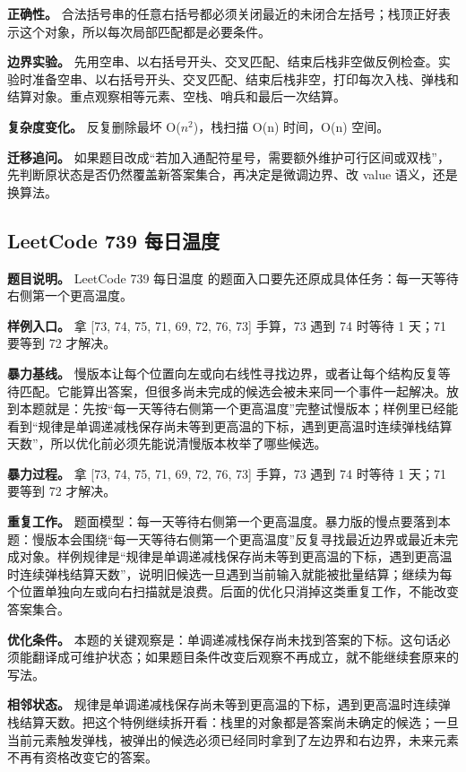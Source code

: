 \textbf{正确性。} 合法括号串的任意右括号都必须关闭最近的未闭合左括号；栈顶正好表示这个对象，所以每次局部匹配都是必要条件。

\textbf{边界实验。} 先用空串、以右括号开头、交叉匹配、结束后栈非空做反例检查。实验时准备空串、以右括号开头、交叉匹配、结束后栈非空，打印每次入栈、弹栈和结算对象。重点观察相等元素、空栈、哨兵和最后一次结算。

\textbf{复杂度变化。} 反复删除最坏 O(\ensuremath{n^{2}})，栈扫描 O(n) 时间，O(n) 空间。

\textbf{迁移追问。} 如果题目改成“若加入通配符星号，需要额外维护可行区间或双栈”，先判断原状态是否仍然覆盖新答案集合，再决定是微调边界、改 value 语义，还是换算法。

\subsection{LeetCode 739 每日温度}

\textbf{题目说明。} LeetCode 739 每日温度 的题面入口要先还原成具体任务：每一天等待右侧第一个更高温度。

\textbf{样例入口。} 拿 [73, 74, 75, 71, 69, 72, 76, 73] 手算，73 遇到 74 时等待 1 天；71 要等到 72 才解决。

\textbf{暴力基线。} 慢版本让每个位置向左或向右线性寻找边界，或者让每个结构反复等待匹配。它能算出答案，但很多尚未完成的候选会被未来同一个事件一起解决。放到本题就是：先按“每一天等待右侧第一个更高温度”完整试慢版本；样例里已经能看到“规律是单调递减栈保存尚未等到更高温的下标，遇到更高温时连续弹栈结算天数”，所以优化前必须先能说清慢版本枚举了哪些候选。

\textbf{暴力过程。} 拿 [73, 74, 75, 71, 69, 72, 76, 73] 手算，73 遇到 74 时等待 1 天；71 要等到 72 才解决。

\textbf{重复工作。} 题面模型：每一天等待右侧第一个更高温度。暴力版的慢点要落到本题：慢版本会围绕“每一天等待右侧第一个更高温度”反复寻找最近边界或最近未完成对象。样例规律是“规律是单调递减栈保存尚未等到更高温的下标，遇到更高温时连续弹栈结算天数”，说明旧候选一旦遇到当前输入就能被批量结算；继续为每个位置单独向左或向右扫描就是浪费。后面的优化只消掉这类重复工作，不能改变答案集合。

\textbf{优化条件。} 本题的关键观察是：单调递减栈保存尚未找到答案的下标。这句话必须能翻译成可维护状态；如果题目条件改变后观察不再成立，就不能继续套原来的写法。

\textbf{相邻状态。} 规律是单调递减栈保存尚未等到更高温的下标，遇到更高温时连续弹栈结算天数。把这个特例继续拆开看：栈里的对象都是答案尚未确定的候选；一旦当前元素触发弹栈，被弹出的候选必须已经同时拿到了左边界和右边界，未来元素不再有资格改变它的答案。

